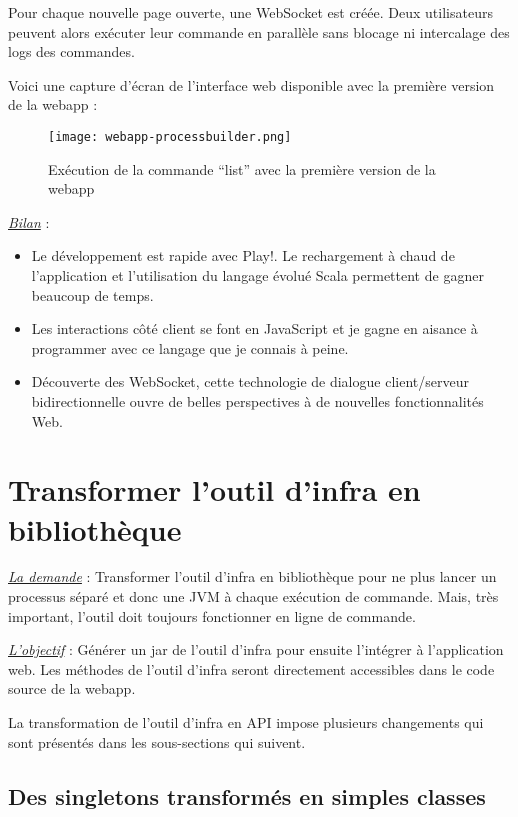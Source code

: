 Pour chaque nouvelle page ouverte, une WebSocket est créée.
Deux utilisateurs peuvent alors exécuter leur commande en parallèle sans
blocage ni intercalage des logs des commandes.

Voici une capture d'écran de l'interface web disponible avec la première version
de la webapp :
\begin{figure}[H]
  \texttt{[image: webapp-processbuilder.png]}
  \caption{Exécution de la commande ``list'' avec la première version de la webapp}
\end{figure}

\underline{\textit{Bilan}} :
\begin{itemize}
\item Le développement est rapide avec Play!. Le rechargement à
  chaud de l'application et l'utilisation du langage évolué Scala permettent de
  gagner beaucoup de temps.  
\item Les interactions côté client se font en JavaScript et
  je gagne en aisance à programmer avec ce langage que je connais à peine.
\item  Découverte des WebSocket, cette technologie de dialogue client/serveur
  bidirectionnelle ouvre de belles perspectives à de nouvelles fonctionnalités
  Web.
\end{itemize}

\section{Transformer l'outil d'infra en bibliothèque}

\underline{\textit{La demande}} : Transformer l'outil d'infra en bibliothèque pour ne plus
lancer un processus séparé et donc une JVM à chaque exécution de commande.
Mais, très important, l'outil doit toujours fonctionner en ligne de
commande.

\underline{\textit{L'objectif}} : Générer un jar de l'outil d'infra pour ensuite
l'intégrer à l'application web. Les méthodes de l'outil d'infra seront
directement accessibles dans le code source de la webapp.

La transformation de l'outil d'infra en API impose plusieurs changements qui
sont présentés dans les sous-sections qui suivent.

\subsection{Des singletons transformés en simples classes}

